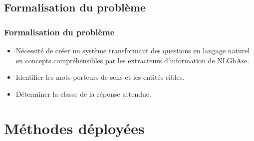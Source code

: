 \documentclass[xcolor=dvipsnames]{beamer}
\begin{document}
\subsection{Formalisation du problème}
\frame 
{
    \frametitle{Formalisation du problème}
    \begin{itemize}
        \item<1-> Nécessité de créer un système transformant des questions en langage naturel en \og{}concepts\fg{} compréhensibles par les extracteurs d'information de NLGbAse.
        \item<2-> Identifier les mots porteurs de sens et les entités cibles.
        \item<3-> Déterminer la classe de la réponse attendue.
    \end{itemize}
}

\section{Méthodes déployées}
\end{document}
